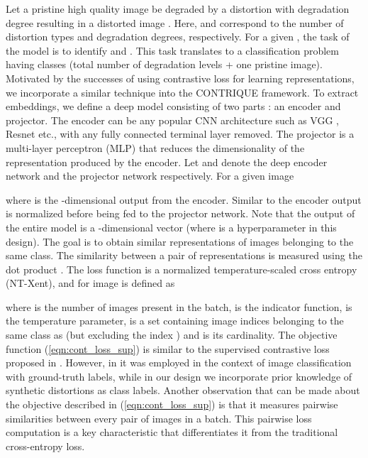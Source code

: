 \documentclass[journal]{IEEEtran}
\begin{document}
Let a pristine high quality image  be degraded by a distortion  with degradation degree  resulting in a distorted image . Here,  and  correspond to the number of distortion types and degradation degrees, respectively. For a given , the task of the model is to identify  and . This task translates to a classification problem having  classes (total number of degradation levels + one pristine image). Motivated by the successes of using contrastive loss \cite{chen2020simple,he2020momentum} for learning representations, we incorporate a similar technique into the CONTRIQUE framework. To extract embeddings, we define a deep model consisting of two parts : an encoder and projector. The encoder can be any popular CNN architecture such as VGG \cite{simonyan2014very}, Resnet \cite{he2016deep} etc., with any fully connected terminal layer removed. The projector is a multi-layer perceptron (MLP) that reduces the dimensionality of the representation produced by the encoder. Let  and  denote the deep encoder network and the projector network respectively. For a given image 

where  is the -dimensional output from the encoder. Similar to \cite{chen2020simple,he2020momentum} the encoder output  is  normalized before being fed to the projector network. Note that the output of the entire model  is a -dimensional vector (where  is a hyperparameter in this design). The goal is to obtain similar representations  of images belonging to the same class. The similarity between a pair of representations is measured using the dot product . The loss function is a normalized temperature-scaled cross entropy (NT-Xent), and for image  is defined as 

where  is the number of images present in the batch,  is the indicator function,  is the temperature parameter,  is a set containing image indices belonging to the same class as  (but excluding the index ) and  is its cardinality. The objective function (\ref{eqn:cont_loss_sup}) is similar to the supervised contrastive loss proposed in \cite{khosla2020supervised}. However, in \cite{khosla2020supervised} it was employed in the context of image classification with ground-truth labels, while in our design we incorporate prior knowledge of synthetic distortions as class labels. Another observation that can be made about the objective described in (\ref{eqn:cont_loss_sup}) is that it measures pairwise similarities between every pair of images in a batch. This pairwise loss computation is a key characteristic that differentiates it from the traditional cross-entropy loss.
\end{document}
